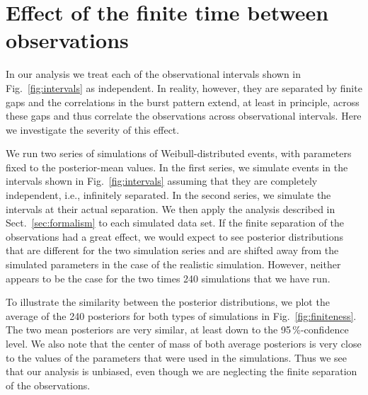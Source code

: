 \documentclass[fleqn,usenatbib]{mnras}
\begin{document}
\appendix
\section{Effect of the finite time between observations}
\label{sec:finiteness}

In our analysis we treat each of the observational intervals shown in Fig.~\ref{fig:intervals} as independent. In reality, however, they are separated by finite gaps and the correlations in the burst pattern extend, at least in principle, across these gaps and thus correlate the observations across observational intervals. Here we investigate the severity of this effect.

We run two series of simulations of Weibull-distributed events, with parameters fixed to the posterior-mean values. In the first series, we simulate events in the intervals shown in Fig.~\ref{fig:intervals} assuming that they are completely independent, i.e., infinitely separated. In the second series, we simulate the intervals at their actual separation. We then apply the analysis described in Sect.~\ref{sec:formalism} to each simulated data set. If the finite separation of the observations had a great effect, we would expect to see posterior distributions that are different for the two simulation series and are shifted away from the simulated parameters in the case of the realistic simulation. However, neither appears to be the case for the two times 240 simulations that we have run.

To illustrate the similarity between the posterior distributions, we plot the average of the 240 posteriors for both types of simulations in Fig.~\ref{fig:finiteness}. The two mean posteriors are very similar, at least down to the 95\,\%-confidence level. We also note that the center of mass of both average posteriors is very close to the values of the parameters that were used in the simulations. Thus we see that our analysis is unbiased, even though we are neglecting the finite separation of the observations.
\end{document}

